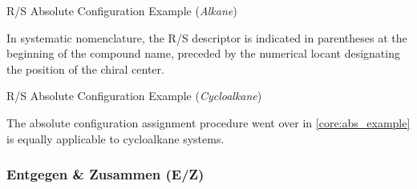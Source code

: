 \documentclass[10pt]{article}
\begin{document}
\begin{core}[label=core:abs_example]{R/S Absolute Configuration Example (\textit{Alkane})}
\begin{enumerate}
        \end{enumerate}

        In systematic nomenclature, the R/S descriptor is indicated in parentheses at the beginning of the compound name, preceded by the numerical locant designating the position of the chiral center.


      \end{core}

      \begin{core}{R/S Absolute Configuration Example (\textit{Cycloalkane})}

        The absolute configuration assignment procedure went over in \autoref{core:abs_example} is equally applicable to cycloalkane systems.


      \end{core}
  
    \subsubsection{Entgegen \& Zusammen (E/Z)}
      \label{sec:ez}
\end{document}
